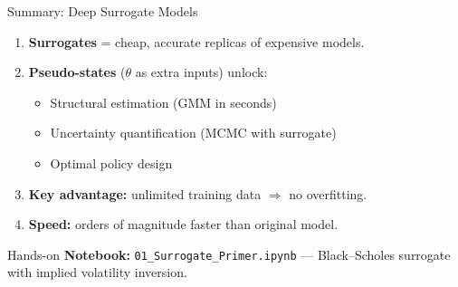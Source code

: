 \documentclass[aspectratio=169,11pt]{beamer}
\begin{document}
\begin{frame}{Summary: Deep Surrogate Models}
\begin{enumerate}
  \item \textbf{Surrogates} = cheap, accurate replicas of expensive models.
  \item \textbf{Pseudo-states} ($\theta$ as extra inputs) unlock:
  \begin{itemize}
    \item Structural estimation (GMM in seconds)
    \item Uncertainty quantification (MCMC with surrogate)
    \item Optimal policy design
  \end{itemize}
  \item \textbf{Key advantage:} unlimited training data $\Rightarrow$ no overfitting.
  \item \textbf{Speed:} orders of magnitude faster than original model.
\end{enumerate}

\vspace{0.3cm}
\begin{block}{Hands-on}
\textbf{Notebook:} \texttt{01\_Surrogate\_Primer.ipynb} --- Black--Scholes surrogate with implied volatility inversion.
\end{block}
\end{frame}

\end{document}
